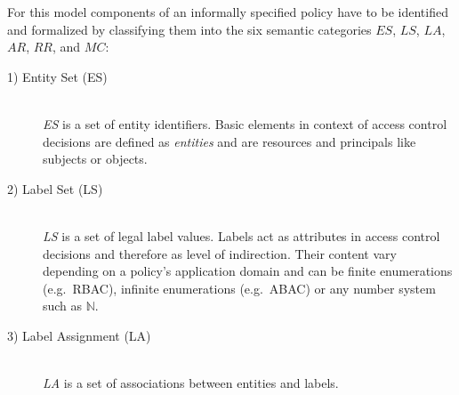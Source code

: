 \documentclass[twoside, openright, 12pt]{book}
\begin{document}
For this model components of an informally specified policy have to be identified and formalized by classifying them into the six semantic categories $ES$, $LS$, $LA$, $AR$, $RR$, and $MC$:

\begin{description}
\item[1) Entity Set (ES)]\hfill \\
\textit{ES} is a set of entity identifiers.
Basic elements in context of access control decisions are defined as \textit{entities} and are resources and principals like subjects or objects.


\item[2) Label Set (LS)]\hfill \\
\textit{LS} is a set of legal label values.
Labels act as attributes in access control decisions and therefore as level of indirection.
Their content vary depending on a policy's application domain and can be finite enumerations (e.g.~RBAC), infinite enumerations (e.g.~ABAC) or any number system such as $\mathbb{N}$.


\item[3) Label Assignment (LA)]\hfill \\
\textit{LA} is a set of associations between entities and labels.



\end{description}
\end{document}
